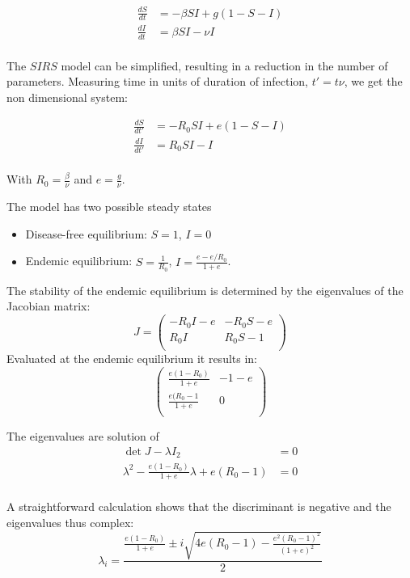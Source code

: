 \documentclass[12pt]{article}
\begin{document}
\begin{align}
  \frac{dS}{dt} & = -\beta S I + g (1-S-I)\\
  \frac{dI}{dt} & = \beta S I - \nu I\\
\end{align}

The $SIRS$ model can be simplified, resulting in a
reduction in the number of parameters. Measuring time
in units of duration of infection, $t'=t \nu$, we get the non dimensional system:

\begin{align*}
  \frac{dS}{dt'} & = -R_0 S I + e (1-S-I)\\
  \frac{dI}{dt'} & = R_0 S I - I\\
\end{align*}

With $R_0=\frac{\beta}{\nu}$ and $e=\frac{g}{\nu}$.

The model has two possible steady states
\begin{itemize}
\item Disease-free equilibrium: $S=1$, $I=0$
\item Endemic equilibrium: $S=\frac{1}{R_0}$, $I=\frac{e-e/R_0}{1+e}$.
\end{itemize}

The stability of the endemic equilibrium is determined by the
eigenvalues of the Jacobian matrix:
$$J=
\begin{pmatrix}
  -R_0 I -e & -R_0 S -e\\
  R_0 I & R_0 S-1 \\
\end{pmatrix}$$
Evaluated at the endemic equilibrium it results in:
$$\begin{pmatrix}
\frac{e(1-R_0)}{1+e} & -1-e \\
\frac{e(R_0 -1}{1+e} & 0 \\
\end{pmatrix}$$

The eigenvalues are solution of
\begin{align*}
\det{J-\lambda I_2} & = 0 \\
\lambda^2 - \frac{e(1-R_0)}{1+e} \lambda +e(R_0-1) & =0\\
\end{align*}

A straightforward calculation shows that the discriminant is negative and the eigenvalues thus complex:
$$\lambda_i = \frac{\frac{e(1-R_0)}{1+e} \pm i \sqrt{4 e (R_0-1)-\frac{e^2(R_0-1)^2}{(1+e)^2}}}{2} $$
\end{document}
